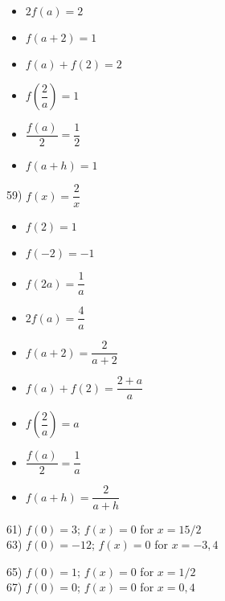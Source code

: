 \documentclass[12pt]{book}
\theoremstyle{definition}
\begin{document}
\begin{multicols}{3}
\begin{itemize}
\item  $2 f(a)=2$
\item $f(a+2)=1$
\item $f(a) + f(2)=2$
\end{itemize}
\end{multicols}

\begin{multicols}{3}
\begin{itemize}
\item  $f \left( \dfrac{2}{a} \right)=1$
\item $\dfrac{f(a)}{2}=\dfrac{1}{2}$
\item  $f(a + h)=1$
\end{itemize}
\end{multicols}

59) $f(x)=\dfrac{2}{x}$
\begin{multicols}{3}
\begin{itemize}
\item  $f(2)=1$
\item  $f(-2)=-1$
\item  $f(2a)=\dfrac{1}{a}$
\end{itemize}
\end{multicols}

\begin{multicols}{3}
\begin{itemize}
\item  $2 f(a)=\dfrac{4}{a}$
\item $f(a+2)=\dfrac{2}{a+2}$
\item $f(a) + f(2)=\dfrac{2+a}{a}$
\end{itemize}
\end{multicols}

\begin{multicols}{3}
\begin{itemize}
\item  $f \left( \dfrac{2}{a} \right)=a$
\item $\dfrac{f(a)}{2}=\dfrac{1}{a}$
\item  $f(a + h)=\dfrac{2}{a+h}$
\end{itemize}
\end{multicols}

\begin{multicols}{2}
61) $f(0)=3$; $f(x)=0$ for $x=15/2$\\
63) $f(0)=-12$; $f(x)=0$ for $x=-3,4$
\end{multicols}
\begin{multicols}{2}
65) $f(0)=1$; $f(x)=0$ for $x=1/2$\\
67) $f(0)=0$; $f(x)=0$ for $x=0,4$
\end{multicols}
\end{document}
